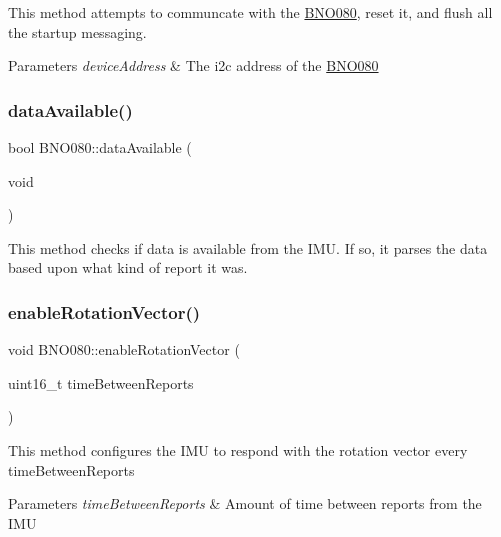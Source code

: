 This method attempts to communcate with the \mbox{\hyperlink{classBNO080}{B\+N\+O080}}, reset it, and flush all the startup messaging. 
\begin{DoxyParams}{Parameters}
{\em device\+Address} & The i2c address of the \mbox{\hyperlink{classBNO080}{B\+N\+O080}} \\
\hline
\end{DoxyParams}
\mbox{\label{classBNO080_a27933a4623309a040eb0d456723ff57b}} 
\subsubsection{\texorpdfstring{dataAvailable()}{dataAvailable()}}
{\footnotesize\ttfamily bool B\+N\+O080\+::data\+Available (\begin{DoxyParamCaption}\item[{void}]{ }\end{DoxyParamCaption})}

This method checks if data is available from the I\+MU. If so, it parses the data based upon what kind of report it was. \mbox{\label{classBNO080_a6e909dff75a75500117287304004aac6}} 
\subsubsection{\texorpdfstring{enableRotationVector()}{enableRotationVector()}}
{\footnotesize\ttfamily void B\+N\+O080\+::enable\+Rotation\+Vector (\begin{DoxyParamCaption}\item[{uint16\+\_\+t}]{time\+Between\+Reports }\end{DoxyParamCaption})}

This method configures the I\+MU to respond with the rotation vector every time\+Between\+Reports 
\begin{DoxyParams}{Parameters}
{\em time\+Between\+Reports} & Amount of time between reports from the I\+MU \\
\hline
\end{DoxyParams}
\mbox{\label{classBNO080_ac50fa6ed3ae8b5561ee42e9830c83a7c}} 

